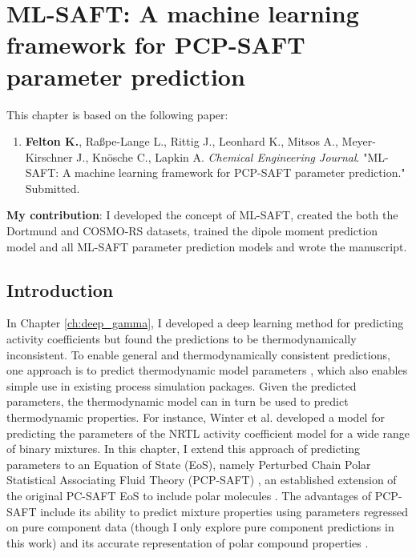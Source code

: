 \chapter{ML-SAFT: A machine learning framework for PCP-SAFT parameter prediction}\label{ch:ml_saft} 
This chapter is based on the following paper:
\begin{enumerate}
\item \textbf{Felton K.}, Ra{\ss}pe-Lange L., Rittig J., Leonhard K., Mitsos A., Meyer-Kirschner J., Kn\"osche C., Lapkin A. \textit{Chemical Engineering Journal}. "ML-SAFT: A machine learning framework for PCP-SAFT parameter prediction." Submitted.
\end{enumerate}

\textbf{My contribution}: I developed the concept of ML-SAFT, created the both the Dortmund and COSMO-RS datasets, trained the dipole moment prediction model and all ML-SAFT parameter prediction models and wrote the manuscript.

\section{Introduction}
In Chapter \ref{ch:deep_gamma}, I developed a deep learning method for predicting activity coefficients but found the predictions to be thermodynamically inconsistent. To enable general and thermodynamically consistent predictions, one approach is to predict thermodynamic model parameters \cite{Abbasi2020, Matsukawa2021, Madani2021, Abdallahelhadj2022, Winter2022}, which also enables simple use in existing process simulation packages. Given the predicted parameters, the thermodynamic model can in turn be used to predict thermodynamic properties. For instance, Winter et al. \cite{Winter2022} developed a model for predicting the parameters of the NRTL activity coefficient model for a wide range of binary mixtures. In this chapter, I extend this approach of predicting parameters to an Equation of State (EoS), namely Perturbed Chain Polar Statistical Associating Fluid Theory (PCP-SAFT) \cite{Gross2006}, an established extension of the original PC-SAFT EoS to include polar molecules \cite{Gross2001}. The advantages of PCP-SAFT include its ability to predict mixture properties using parameters regressed on pure component data (though I only explore pure component predictions in this work) and its accurate representation of polar compound properties \cite{Cripwell2017}. 

